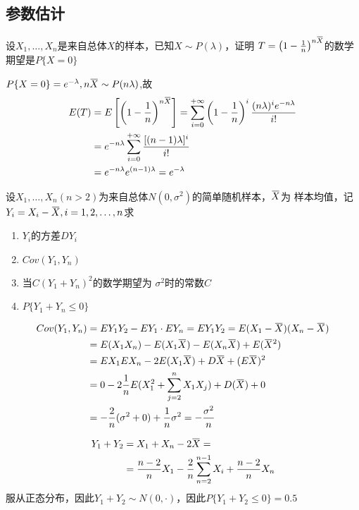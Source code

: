 \documentclass{article}
\begin{document}
\subsection{参数估计}
\label{sec:orgeb90d91}
\begin{examplle}[]
设\(X_1,\dots,X_n\)是来自总体\(X\)的样本，已知\(X\sim P(\lambda)\)，证明
\(T=\left(1-\frac{1}{n}\right)^{n\bbar{X}}\)的数学期望是\(P\{X=0\}\)

\(P\{X=0\}=e^{-\lambda},n\bbar{X}\sim P(n\lambda)\),故
\begin{align*}
E(T)&=E\left[\left(1-\frac{1}{n}\right)^{n\bbar{X}}\right]=
\sum_{i=0}^{+\infty}\left(1-\frac{1}{n}\right)^i\frac{(n\lambda)^ie^{-n\lambda}}{i!}\\
&=e^{-n\lambda}\sum_{i=0}^{+\infty}\frac{[(n-1)\lambda]^i}{i!}\\
&=e^{-n\lambda}e^{(n-1)\lambda}=e^{-\lambda}
\end{align*}
\end{examplle}

\begin{examplle}[]
设\(X_1,\dots,X_n(n>2)\)为来自总体\(N(0,\sigma^2)\)的简单随机样本，\(\bbar{X}\)为
样本均值，记\(Y_i=X_i-\bbar{X},i=1,2,\dots,n\)求
\begin{enumerate}
\item \(Y_i\)的方差\(DY_i\)
\item \(Cov(Y_1,Y_n)\)
\item 当\(C(Y_1+Y_n)^2\)的数学期望为 \(\sigma^2\)时的常数\(C\)
\item \(P\{Y_1+Y_n\le0\}\)
\end{enumerate}


\begin{align*}
Cov(Y_1,Y_n)&=EY_1Y_2-EY_1\cdot EY_n=EY_1Y_2=E(X_1-\bbar{X})(X_n-\bbar{X})\\
&=E(X_1X_n)-E(X_1\bbar{X})-E(X_n\bbar{X})+E(\bbar{X}^2)\\
&=EX_1EX_n-2E(X_1\bbar{X})+D\bbar{X}+(E\bbar{X})^2\\
&=0-2\frac{1}{n}E(X_1^2+\sum_{j=2}^nX_1X_j)+D(\bbar{X})+0\\
&=-\frac{2}{n}(\sigma^2+0)+\frac{1}{n}\sigma^2=-\frac{\sigma^2}{n}
\end{align*}

\begin{align*}
Y_1+Y_2&=X_1+X_n-2\bbar{X}=\\
&=\frac{n-2}{n}X_1-\frac{2}{n}\sum_{n=2}^{n-1}X_i+\frac{n-2}{n}X_n
\end{align*}
服从正态分布，因此\(Y_1+Y_2\sim N(0,\cdot)\)，因此\(P\{Y_1+Y_2\le0\}=0.5\)
\end{examplle}
\end{document}
